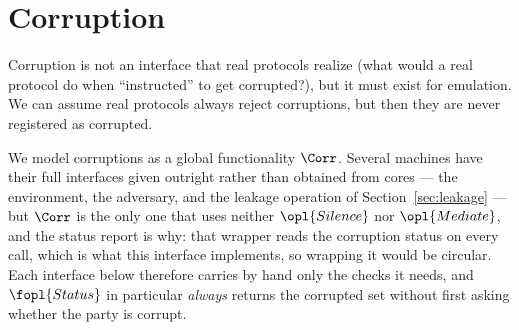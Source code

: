 \documentclass[10pt,oneside,openany]{book}
\theoremstyle{accentdef}
\theoremstyle{accentplain}
\begin{document}

\section{Corruption}\label{sec:corruption}

Corruption is not an interface that real protocols realize (what would a real protocol do when
``instructed'' to get corrupted?), but it must exist for emulation. We can assume
real protocols always reject corruptions, but then they are never registered as corrupted.

We model corruptions as a global functionality $\Corr$. Several machines have their full
interfaces given outright rather than obtained from cores --- the environment, the adversary, and
the leakage operation of Section~\ref{sec:leakage} --- but $\Corr$ is the only one that uses
neither $\opl{Silence}$ nor $\opl{Mediate}$, and the status report is why: that wrapper reads the
corruption status on every call, which is what this interface implements, so wrapping it would be
circular. Each interface below therefore carries by hand only the checks it needs, and
$\fopl{Status}$ in particular \emph{always} returns the corrupted set without first asking
whether the party is corrupt.
\end{document}
